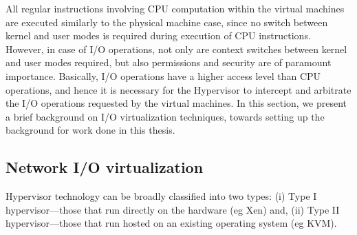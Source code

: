 All regular instructions involving CPU computation within the
virtual machines are executed similarly to the physical machine
case, since no
switch between kernel and user modes is required during execution of
CPU instructions. However, in case of I/O operations, not only are
context switches between kernel and user modes required,
but also permissions and security are of paramount importance.
Basically, I/O operations have a higher access level
than CPU operations, and hence it is necessary for the Hypervisor
to intercept and arbitrate the I/O operations requested 
by the virtual machines. In this section, we present 
a brief background on I/O virtualization techniques, towards
setting up the background for work done in this thesis.

\subsection{Network I/O virtualization}
Hypervisor technology can be broadly classified into two types: 
(i) Type I hypervisor---those that run directly on the hardware (eg Xen) and, 
(ii) Type II hypervisor---those that run hosted on an existing operating system (eg KVM).


